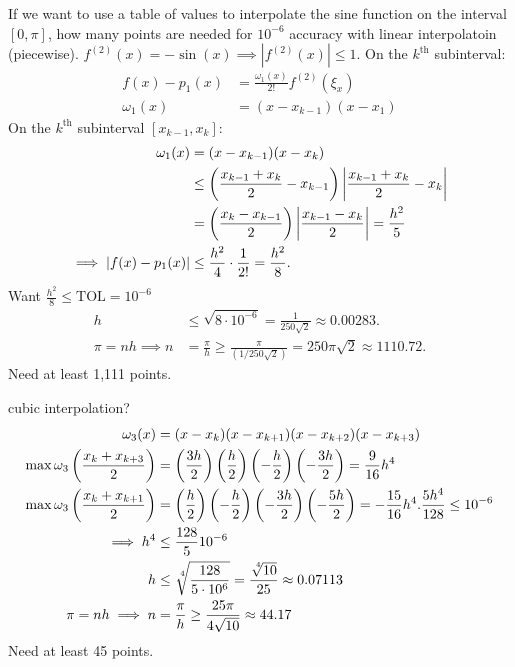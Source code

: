 \documentclass[]{article}
\begin{document}
\begin{example}
	If we want to use a table of values to interpolate the sine function on the interval $[0,\pi]$, how many points are needed for $10^{-6}$ accuracy with linear interpolatoin (piecewise).
	$f^{(2)}(x) = -\sin(x) \implies |f^{(2)}(x)| \leq 1$.
	On the $k^\text{th}$ subinterval:
	\begin{align*}
		f(x)-p_1(x) &= \frac{\omega_1(x)}{2!} f^{(2)}(\xi_x) \\
		\omega_1(x) &= (x-x_{k-1})(x-x_1)
	\end{align*}
	On the $k^\text{th}$ subinterval $[x_{k-1},x_k]$:
	\begin{align*}
		\omega_1(x) &= (x-x_{k-1})(x-x_k) \\
					&\leq \left(\frac{x_{k-1}+x_k}2-x_{k-1}\right)\left|\frac{x_{k-1}+x_k}2-x_k\right|\\
					&= \left(\frac{x_k-x_{k-1}}2\right)\left|\frac{x_{k-1}-x_k}2\right| = \frac{h^2}5\\
		\implies |f(x)-p_1(x)| &\leq \frac{h^2}4\cdot\frac1{2!} = \frac{h^2}8.
	\end{align*}
	Want $\frac{h^2}8 \leq \text{TOL} = 10^{-6}$
	\begin{align*}
		h &\leq \sqrt{8\cdot10^{-6}} = \frac1{250\sqrt2} \approx 0.00283.\\
		\pi = nh \implies n &= \frac\pi h \geq \frac\pi{(1/250\sqrt2)} = 250\pi\sqrt2 \approx 1110.72.
	\end{align*}
	Need at least 1,111 points.
\end{example}
\begin{example}
	[continued] cubic interpolation?
	\begin{align*}
		\omega_3(x) &= (x-x_k)(x-x_{k+1})(x-x_{k+2})(x-x_{k+3}) \\
		\max \omega_3\plr{\frac{x_k+x_{k+3}}2} &= \plr{\frac{3h}2}\plr{\frac h2}\plr{-\frac h2}\plr{-\frac{3h}2} = \frac9{16}h^4 \\
		\max \omega_3\plr{\frac{x_k+x_{k+1}}2} &= \plr{\frac h2}\plr{-\frac h2}\plr{-\frac{3h}2}\plr{-\frac{5h}2} = -\frac{15}{16}h^4.
		\frac{5h^4}{128} \leq 10^{-6} \\\implies h^4 &\leq \frac{128}510^{-6} \\
		h &\leq \nrt4{\frac{128}{5\cdot10^6}} = \frac{\nrt4{10}}{25} \approx 0.07113 \\
		\pi = nh \implies n &= \frac\pi h\geq \frac{25\pi}{4\sqrt{10}} \approx 44.17
	\end{align*}
	Need at least 45 points.
\end{example}
\end{document}
